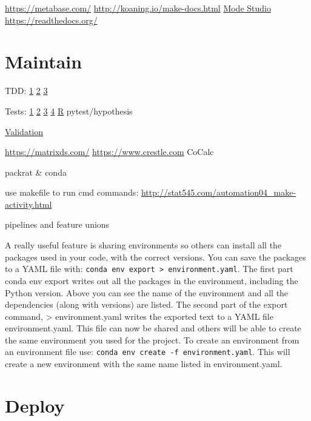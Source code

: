 \documentclass[]{book}
\begin{document}
\url{https://metabase.com/} \url{http://koaning.io/make-docs.html} \href{https://about.modeanalytics.com/}{Mode Studio} \url{https://readthedocs.org/}

\hypertarget{maintain}{%
\section{Maintain}\label{maintain}}

TDD: \href{http://engineering.pivotal.io/post/test-driven-development-for-data-science/}{1} \href{http://www.tdda.info/}{2} \href{http://stochasticsolutions.com/}{3}

Tests: \href{http://engineering.pivotal.io/post/test-driven-development-for-data-science/}{1} \href{http://www.tdda.info/}{2} \href{http://stochasticsolutions.com/}{3} \href{https://github.com/ericmjl/data-testing-tutorial}{4} \href{http://r-pkgs.had.co.nz/tests.html}{R} pytest/hypothesis

\href{https://rdrr.io/cran/checkmate/}{Validation}

\url{https://matrixds.com/} \url{https://www.crestle.com} CoCalc

packrat \& conda

use makefile to run cmd commands: \url{http://stat545.com/automation04_make-activity.html}

pipelines and feature unions

A really useful feature is sharing environments so others can install all the packages used in your code, with the correct versions. You can save the packages to a YAML file with: \texttt{conda\ env\ export\ \textgreater{}\ environment.yaml}.
The first part conda env export writes out all the packages in the environment, including the Python version. Above you can see the name of the environment and all the dependencies (along with versions) are listed. The second part of the export command, \textgreater{} environment.yaml writes the exported text to a YAML file environment.yaml. This file can now be shared and others will be able to create the same environment you used for the project. To create an environment from an environment file use: \texttt{conda\ env\ create\ -f\ environment.yaml}. This will create a new environment with the same name listed in environment.yaml.

\hypertarget{deploy}{%
\section{Deploy}\label{deploy}}
\end{document}
